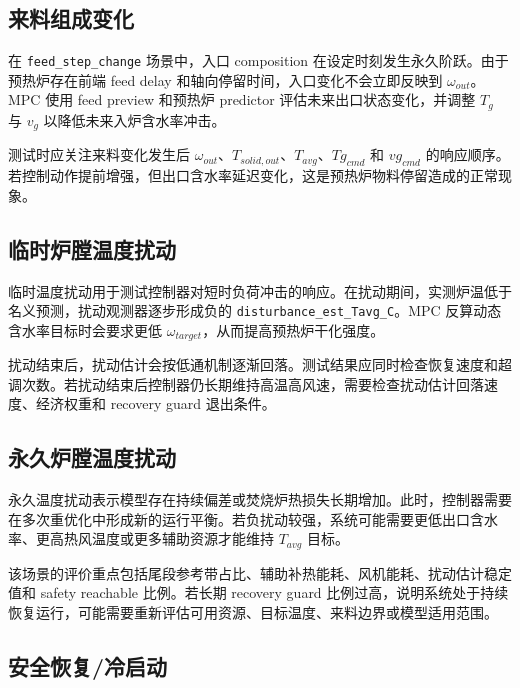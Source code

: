 \documentclass[UTF8,openany,zihao=-4,oneside]{ctexbook}
\providecommand{\passthrough}[1]{#1}
\begin{document}
\subsection{来料组成变化}\label{subsec:feed-disturbance-policy}

在 \passthrough{\lstinline!feed_step_change!} 场景中，入口 composition 在设定时刻发生永久阶跃。由于预热炉存在前端 feed delay 和轴向停留时间，入口变化不会立即反映到 \(\omega_{out}\)。MPC 使用 feed preview 和预热炉 predictor 评估未来出口状态变化，并调整 \(T_g\) 与 \(v_g\) 以降低未来入炉含水率冲击。

测试时应关注来料变化发生后 \(\omega_{out}\)、\(T_{solid,out}\)、\(T_{avg}\)、\(Tg_{cmd}\) 和 \(vg_{cmd}\) 的响应顺序。若控制动作提前增强，但出口含水率延迟变化，这是预热炉物料停留造成的正常现象。

\subsection{临时炉膛温度扰动}\label{subsec:temporary-furnace-disturbance-policy}

临时温度扰动用于测试控制器对短时负荷冲击的响应。在扰动期间，实测炉温低于名义预测，扰动观测器逐步形成负的 \passthrough{\lstinline!disturbance_est_Tavg_C!}。MPC 反算动态含水率目标时会要求更低 \(\omega_{target}\)，从而提高预热炉干化强度。

扰动结束后，扰动估计会按低通机制逐渐回落。测试结果应同时检查恢复速度和超调次数。若扰动结束后控制器仍长期维持高温高风速，需要检查扰动估计回落速度、经济权重和 recovery guard 退出条件。

\subsection{永久炉膛温度扰动}\label{subsec:permanent-furnace-disturbance-policy}

永久温度扰动表示模型存在持续偏差或焚烧炉热损失长期增加。此时，控制器需要在多次重优化中形成新的运行平衡。若负扰动较强，系统可能需要更低出口含水率、更高热风温度或更多辅助资源才能维持 \(T_{avg}\) 目标。

该场景的评价重点包括尾段参考带占比、辅助补热能耗、风机能耗、扰动估计稳定值和 safety reachable 比例。若长期 recovery guard 比例过高，说明系统处于持续恢复运行，可能需要重新评估可用资源、目标温度、来料边界或模型适用范围。

\subsection{安全恢复/冷启动}\label{subsec:recovery-guard-policy}
\end{document}
